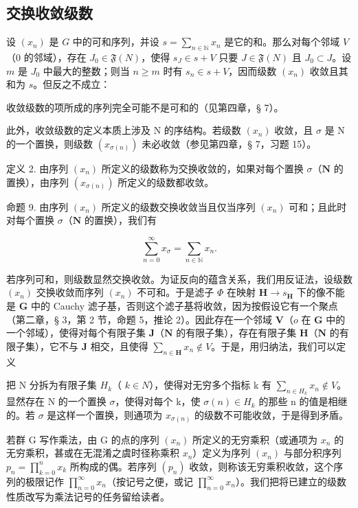 \subsection{交换收敛级数}

设 \((x_{n})\) 是 \(G\) 中的可和序列，并设 \(s = \sum_{n\in \mathbb{N}}x_n\) 是它的和。那么对每个邻域 \(V\)（\(0\) 的邻域），存在 \(J_0\in \mathfrak{F}(N)\)，使得 \(s_J\in s + V\) 只要 \(J\in \mathfrak{F}(N)\) 且 \(J_0\subset J\)。设 \(m\) 是 \(J_0\) 中最大的整数；则当 \(n\geqslant m\) 时有 \(s_n\in s + V\)，因而级数 \((x_{n})\) 收敛且其和为 \(s\)。但反之不成立：

收敛级数的项所成的序列完全可能不是可和的（见第四章，§ 7）。

此外，收敛级数的定义本质上涉及 N 的序结构。若级数 \((x_{n})\) 收敛，且 \(\sigma\) 是 N 的一个置换，则级数 \((x_{\sigma(n)})\) 未必收敛（参见第四章，§ 7，习题 15）。

定义 2. 由序列 \((x_{n})\) 所定义的级数称为交换收敛的，如果对每个置换 \(\sigma\)（\(\mathbf{N}\) 的置换），由序列 \((x_{\sigma(n)})\) 所定义的级数都收敛。

命题 9. 由序列 \((x_{n})\) 所定义的级数交换收敛当且仅当序列 \((x_{n})\) 可和；且此时对每个置换 \(\sigma\)（\(\mathbf{N}\) 的置换），我们有

\[
\sum_ {n = 0} ^ {\infty} x _ {\sigma} = \sum_ {n \in \mathbb {N}} x _ {n}.
\]

若序列可和，则级数显然交换收敛。为证反向的蕴含关系，我们用反证法，设级数 \((x_{n})\) 交换收敛而序列 \((x_{n})\) 不可和。于是滤子 \(\Phi\) 在映射 \(\mathbf{H} \to s_{\mathbf{H}}\) 下的像不能是 \(\mathbf{G}\) 中的 Cauchy 滤子基，否则这个滤子基将收敛，因为按假设它有一个聚点（第二章，§ 3，第 2 节，命题 5，推论 2）。因此存在一个邻域 \(\mathbf{V}\)（\(o\) 在 \(\mathbf{G}\) 中的一个邻域），使得对每个有限子集 \(\mathbf{J}\)（\(\mathbf{N}\) 的有限子集），存在有限子集 \(\mathbf{H}\)（\(\mathbf{N}\) 的有限子集），它不与 \(\mathbf{J}\) 相交，且使得 \(\sum_{n \in \mathbf{H}} x_{n} \notin V\)。于是，用归纳法，我们可以定义

把 N 分拆为有限子集 \(H_{k}\)（ \(k \in N\)），使得对无穷多个指标 k 有 \(\sum_{n \in H_{k}} x_{n} \notin V\)。显然存在 N 的一个置换 \(\sigma\)，使得对每个 k，使 \(\sigma(n) \in H_{k}\) 的那些 n 的值是相继的。若 \(\sigma\) 是这样一个置换，则通项为 \(x_{\sigma(n)}\) 的级数不可能收敛，于是得到矛盾。

若群 G 写作乘法，由 G 的点的序列 \((x_{n})\) 所定义的无穷乘积（或通项为 \(x_{n}\) 的无穷乘积，甚或在无混淆之虞时径称乘积 \(x_{n}\)）定义为序列 \((x_{n})\) 与部分积序列 \(p_{n}=\prod_{k=0}^{n}x_{k}\) 所构成的偶。若序列 \((p_{n})\) 收敛，则称该无穷乘积收敛，这个序列的极限记作 \(\prod_{n=0}^{\infty}x_{n}\)（按记号之便，或记 \(\prod_{n=0}^{\infty}x_{n}\)）。我们把将已建立的级数性质改写为乘法记号的任务留给读者。

